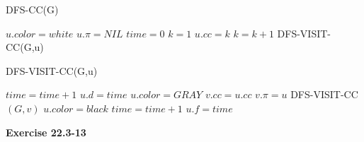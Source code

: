 \documentclass{article}
\begin{document}
\begin{algorithm}
\caption{DFS-CC(G)}
\begin{algorithmic}[1]
	\State $u.color = white$
	\State $u.\pi = NIL$
\EndFor
\State $time = 0$
\State $k = 1$
		\State $u.cc = k$
		\State $k = k + 1$
		\State DFS-VISIT-CC(G,u)
	\EndIf
\EndFor
\end{algorithmic}
\end{algorithm}


\begin{algorithm}
\caption{DFS-VISIT-CC(G,u)}
\begin{algorithmic}[1]
\State $time = time + 1$
\State $u.d = time$
\State $u.color = GRAY$
	\State $v.cc = u.cc$
		\State $v.\pi = u$
		\State DFS-VISIT-CC$(G,v)$
	\EndIf
\EndFor 
\State $u.color = black$
\State $time = time + 1$
\State $u.f = time$
\end{algorithmic}
\end{algorithm}

\noindent\textbf{Exercise 22.3-13}\\
\end{document}
